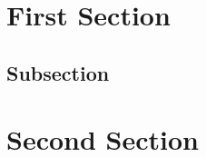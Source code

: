 \documentclass{article}
\begin{document}
\section{First Section}
\subsection{Subsection}
\section{Second Section}
\end{document}

